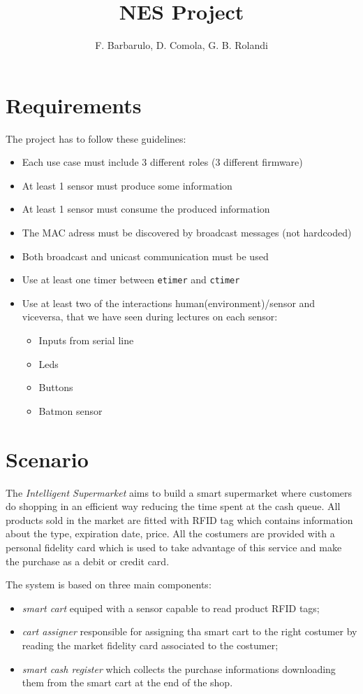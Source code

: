 \documentclass[a4paper,12pt]{article}
\title{NES Project}
\author{F. Barbarulo, D. Comola, G. B. Rolandi}
\newcommand{\systemname}{Intelligent Supermarket}
\begin{document}
\maketitle
\tableofcontents

\clearpage

\section{Requirements}
The project has to follow these guidelines:
\begin{itemize}
  \item Each use case must include 3 different roles (3 different firmware)
	\item At least 1 sensor must produce some information
	\item At least 1 sensor must consume the produced information
	\item The MAC adress must be discovered by broadcast messages (not hardcoded)
	\item Both broadcast and unicast communication must be used
	\item Use at least one timer between \texttt{etimer} and \texttt{ctimer}
	\item Use at least two of the interactions human(environment)/sensor and viceversa, that we have seen during lectures on each sensor:
		\begin{itemize}
			\item Inputs from serial line
			\item Leds
			\item Buttons
			\item Batmon sensor
		\end{itemize}
\end{itemize}

\section{Scenario}
The \textit{\systemname} aims to build a smart supermarket where customers do shopping in an efficient way reducing the time spent at the cash queue. All products sold in the market are fitted with RFID tag which contains information about the type, expiration date, price. All the costumers are provided with a personal fidelity card which is used to take advantage of this service and make the purchase as a debit or credit card.

The system is based on three main components:

\begin{itemize}
  \item \textit{smart cart} equiped with a sensor capable to read product RFID tags;
  \item \textit{cart assigner} responsible for assigning tha smart cart to the right costumer by reading the market fidelity card associated to the costumer;
  \item \textit{smart cash register} which collects the purchase informations downloading them from the smart cart at the end of the shop.  
\end{itemize}
\end{document}
